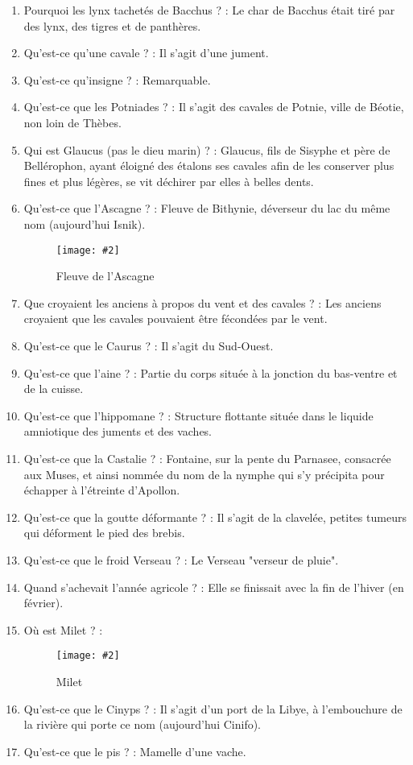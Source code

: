 \documentclass[a4paper, 11pt, hidelinks]{article}
\newcommand{\img}[4]{\begin{figure}[!ht]
    \centering
    \texttt{[image: \#2]}
    \caption{#3}
    \label{#4}
    \end{figure} }
\begin{document}
\begin{enumerate}
      \item Pourquoi les lynx tachetés de Bacchus ? : Le char de Bacchus était tiré par des lynx, des tigres et de panthères.
      \item Qu'est-ce qu'une cavale ? : Il s'agit d'une jument.
      \item Qu'est-ce qu'insigne ? : Remarquable.
      \item Qu'est-ce que les Potniades ? : Il s'agit des cavales de Potnie, ville de Béotie, non loin de Thèbes.
      \item Qui est Glaucus (pas le dieu marin) ? : Glaucus, fils de Sisyphe et père de Bellérophon, ayant éloigné des étalons ses cavales afin de les conserver plus fines et plus
            légères, se vit déchirer par elles à belles dents.
      \item Qu'est-ce que l'Ascagne ? : Fleuve de Bithynie, déverseur du lac du même nom (aujourd'hui Isnik).
            \img{0.5}{Ascagne.png}{Fleuve de l'Ascagne}{124}
      \item Que croyaient les anciens à propos du vent et des cavales ? : Les anciens croyaient que les cavales pouvaient être fécondées par le vent.
      \item Qu'est-ce que le Caurus ? : Il s'agit du Sud-Ouest.
      \item Qu'est-ce que l'aine ? : Partie du corps située à la jonction du bas-ventre et de la cuisse.
      \item Qu'est-ce que l'hippomane ? : Structure flottante située dans le liquide amniotique des juments et des vaches.
      \item Qu'est-ce que la Castalie ? : Fontaine, sur la pente du Parnasee, consacrée aux Muses, et ainsi nommée du nom de la nymphe qui s'y précipita pour échapper à l'étreinte d'Apollon.
      \item Qu'est-ce que la goutte déformante ? : Il s'agit de la clavelée, petites tumeurs qui déforment le pied des brebis.
      \item Qu'est-ce que le froid Verseau ? : Le Verseau "verseur de pluie".
      \item Quand s'achevait l'année agricole ? : Elle se finissait avec la fin de l'hiver (en février).
      \item Où est Milet ? :
            \img{1}{Milet.png}{Milet}{125}
      \item Qu'est-ce que le Cinyps ? : Il s'agit d'un port de la Libye, à l'embouchure de la rivière qui porte ce nom  (aujourd'hui Cinifo).
      \item Qu'est-ce que le pis ? : Mamelle d'une vache.

\end{enumerate}
\end{document}
